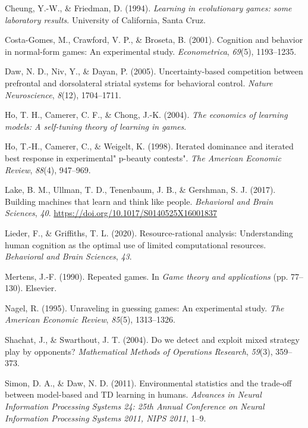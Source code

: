 \documentclass[man,floatsintext]{apa6}
\begin{document}
\leavevmode\hypertarget{ref-cheung1994learning}{}%
Cheung, Y.-W., \& Friedman, D. (1994). \emph{Learning in evolutionary games: some laboratory results}. University of California, Santa Cruz.

\leavevmode\hypertarget{ref-costa2001cognition}{}%
Costa-Gomes, M., Crawford, V. P., \& Broseta, B. (2001). Cognition and behavior in normal-form games: An experimental study. \emph{Econometrica}, \emph{69}(5), 1193--1235.

\leavevmode\hypertarget{ref-daw2005uncertainty}{}%
Daw, N. D., Niv, Y., \& Dayan, P. (2005). Uncertainty-based competition between prefrontal and dorsolateral striatal systems for behavioral control. \emph{Nature Neuroscience}, \emph{8}(12), 1704--1711.

\leavevmode\hypertarget{ref-ho2004economics}{}%
Ho, T. H., Camerer, C. F., \& Chong, J.-K. (2004). \emph{The economics of learning models: A self-tuning theory of learning in games}.

\leavevmode\hypertarget{ref-ho1998iterated}{}%
Ho, T.-H., Camerer, C., \& Weigelt, K. (1998). Iterated dominance and iterated best response in experimental" p-beauty contests". \emph{The American Economic Review}, \emph{88}(4), 947--969.

\leavevmode\hypertarget{ref-Lake2017}{}%
Lake, B. M., Ullman, T. D., Tenenbaum, J. B., \& Gershman, S. J. (2017). Building machines that learn and think like people. \emph{Behavioral and Brain Sciences}, \emph{40}. \url{https://doi.org/10.1017/S0140525X16001837}

\leavevmode\hypertarget{ref-lieder2020resource}{}%
Lieder, F., \& Griffiths, T. L. (2020). Resource-rational analysis: Understanding human cognition as the optimal use of limited computational resources. \emph{Behavioral and Brain Sciences}, \emph{43}.

\leavevmode\hypertarget{ref-mertens1990repeated}{}%
Mertens, J.-F. (1990). Repeated games. In \emph{Game theory and applications} (pp. 77--130). Elsevier.

\leavevmode\hypertarget{ref-nagel1995unraveling}{}%
Nagel, R. (1995). Unraveling in guessing games: An experimental study. \emph{The American Economic Review}, \emph{85}(5), 1313--1326.

\leavevmode\hypertarget{ref-shachat2004we}{}%
Shachat, J., \& Swarthout, J. T. (2004). Do we detect and exploit mixed strategy play by opponents? \emph{Mathematical Methods of Operations Research}, \emph{59}(3), 359--373.

\leavevmode\hypertarget{ref-Simon_Daw_11}{}%
Simon, D. A., \& Daw, N. D. (2011). Environmental statistics and the trade-off between model-based and TD learning in humans. \emph{Advances in Neural Information Processing Systems 24: 25th Annual Conference on Neural Information Processing Systems 2011, NIPS 2011}, 1--9.
\end{document}
